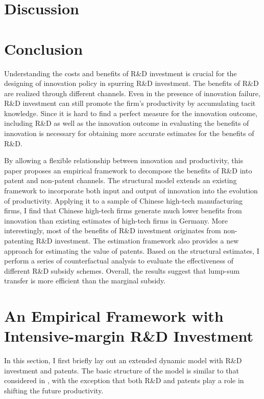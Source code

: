 \documentclass[11pt]{article}
\begin{document}
\section{Discussion}



\section{Conclusion}
Understanding the costs and benefits of R\&D investment is crucial for the designing of innovation policy in spurring R\&D investment. The benefits of R\&D are realized through different channels. Even in the presence of innovation failure, R\&D investment can still promote the firm's productivity by accumulating tacit knowledge. Since it is hard to find a perfect measure for the innovation outcome, including R\&D as well as the innovation outcome in evaluating the benefits of innovation is necessary for obtaining more accurate estimates for the benefits of R\&D. 

By allowing a flexible relationship between innovation and productivity, this paper proposes an empirical framework to decompose the benefits of R\&D into patent and non-patent channels. The structural model extends an existing framework to incorporate both input and output of innovation into the evolution of productivity. Applying it to a sample of Chinese high-tech manufacturing firms, I find that Chinese high-tech firms generate much lower benefits from innovation than existing estimates of high-tech firms in Germany. More interestingly, most of the benefits of R\&D investment originates from non-patenting R\&D investment. The estimation framework also provides a new approach for estimating the value of patents. Based on the structural estimates, I perform a series of counterfactual analysis to evaluate the effectiveness of different R\&D subsidy schemes. Overall, the results suggest that lump-sum transfer is more efficient than the marginal subsidy. 



\clearpage 
\appendix 
\appendixpage 
\section{An Empirical Framework with Intensive-margin R\&D Investment}
In this section, I first briefly lay out an extended dynamic model with R\&D investment and patents. The basic structure of the model is similar to that considered in \cite{Awetal.2011,Doraszelski2013,Peters2016, Peters2017rand}, with the exception that both R\&D and patents play a role in shifting the future productivity. 
\end{document}
